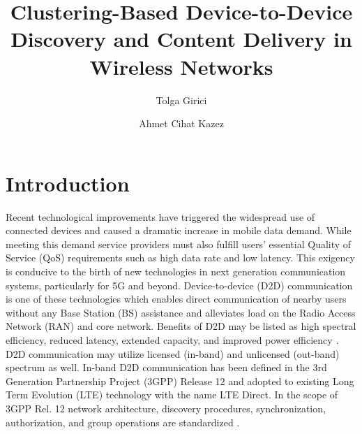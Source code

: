 \documentclass[10pt,a4paper,twocolumn]{article}
\title{Clustering-Based Device-to-Device Discovery and Content Delivery in Wireless Networks}
\author[1,*]{Tolga Girici}
\author[1]{Ahmet Cihat Kazez}
\affil[1]{Electrical and Electronics Engineering, TOBB University of Economics and Technology, Ankara, Turkey}
\affil[*]{\small Corresponding author: Tolga Girici, tgirici@etu.edu.tr}
\date{}
\begin{document}

\section{Introduction} 
\label{sec:intro}
Recent technological improvements have triggered the widespread use of connected devices and caused a dramatic increase in mobile data demand. While meeting this demand service providers must also fulfill users' essential Quality of Service (QoS) requirements such as high data rate and low latency. This exigency is conducive to the birth of new technologies in next generation communication systems, particularly for 5G and beyond. Device-to-device (D2D) communication is one of these technologies which enables direct communication of nearby users without any Base Station (BS) assistance and alleviates load on the Radio Access Network (RAN) and core network. Benefits of D2D may be listed as high spectral efficiency, reduced latency, extended capacity, and improved power efficiency \cite{5GBookAfif}. D2D communication may utilize licensed (in-band) and unlicensed (out-band) spectrum as well. In-band D2D communication has been defined in the 3rd Generation Partnership Project (3GPP) Release 12 and adopted to existing Long Term Evolution (LTE) technology with the name LTE Direct. In the scope of 3GPP Rel. 12 network architecture, discovery procedures, synchronization, authorization, and group operations are standardized \cite{3gpp.23.303}.
\end{document}
